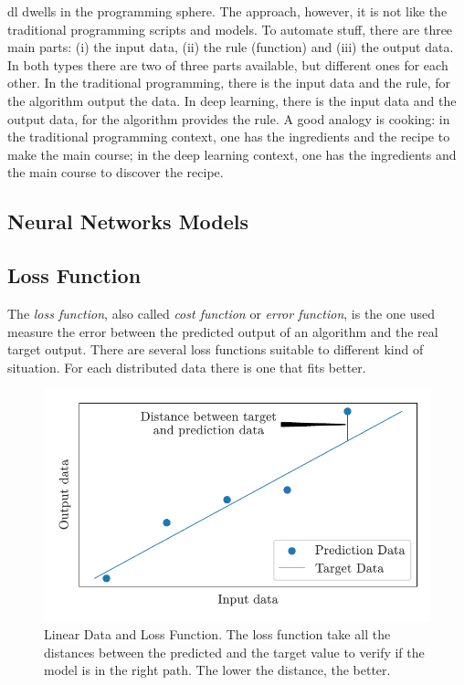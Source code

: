 \gls*{dl} dwells in the programming sphere. The approach, however, it is not like the traditional programming scripts and models. To automate stuff, there are three main parts: (i) the input data, (ii) the rule (function) and (iii) the output data. In both types there are two of three parts available, but different ones for each other. In the traditional programming, there is the input data and the rule, for the algorithm output the data. In deep learning, there is the input data and the output data, for the algorithm provides the rule. A good analogy is cooking: in the traditional programming context, one has the ingredients and the recipe to make the main course; in the deep learning context, one has the ingredients and the main course to discover the recipe.

\subsection{Neural Networks Models}

\subsection{Loss Function}

The \emph{loss function}, also called \emph{cost function} or \emph{error function}, is the one used measure the error between the predicted output of an algorithm and the real target output. 
There are several loss functions suitable to different kind of situation. For each distributed data there is one that fits better.
%
\begin{figure}[!htb]
    \centering
    \includegraphics{figures/3review/nn/mae_chart.pdf}
    \caption[Linear Data and Loss Function]{Linear Data and Loss Function. The loss function take all the distances between the predicted and the target value to verify if the model is in the right path. The lower the distance, the better.}
    \label{fig:mae_chart}
\end{figure}


